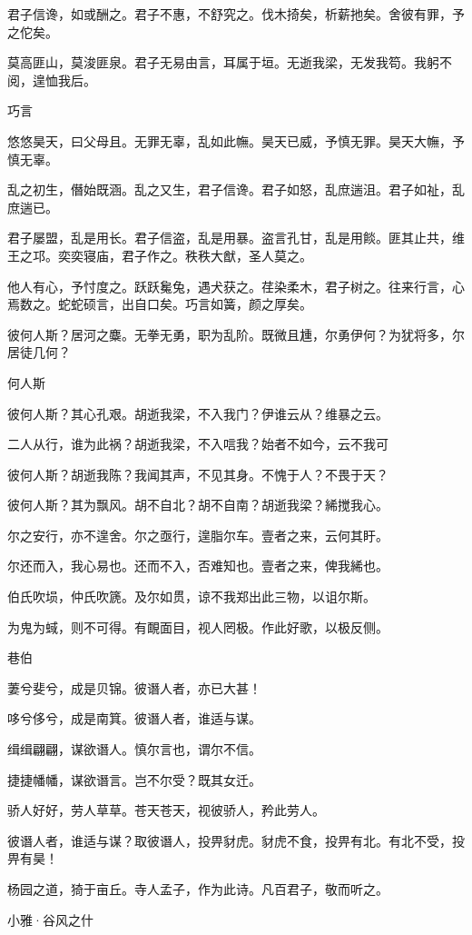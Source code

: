 君子信谗，如或酬之。君子不惠，不舒究之。伐木掎矣，析薪扡矣。舍彼有罪，予之佗矣。

莫高匪山，莫浚匪泉。君子无易由言，耳属于垣。无逝我梁，无发我笱。我躬不阅，遑恤我后。

巧言

悠悠昊天，曰父母且。无罪无辜，乱如此幠。昊天已威，予慎无罪。昊天大幠，予慎无辜。

乱之初生，僭始既涵。乱之又生，君子信谗。君子如怒，乱庶遄沮。君子如祉，乱庶遄已。

君子屡盟，乱是用长。君子信盗，乱是用暴。盗言孔甘，乱是用餤。匪其止共，维王之邛。奕奕寝庙，君子作之。秩秩大猷，圣人莫之。

他人有心，予忖度之。跃跃毚兔，遇犬获之。荏染柔木，君子树之。往来行言，心焉数之。蛇蛇硕言，出自口矣。巧言如簧，颜之厚矣。

彼何人斯？居河之麋。无拳无勇，职为乱阶。既微且尰，尔勇伊何？为犹将多，尔居徒几何？

何人斯

彼何人斯？其心孔艰。胡逝我梁，不入我门？伊谁云从？维暴之云。

二人从行，谁为此祸？胡逝我梁，不入唁我？始者不如今，云不我可

彼何人斯？胡逝我陈？我闻其声，不见其身。不愧于人？不畏于天？

彼何人斯？其为飘风。胡不自北？胡不自南？胡逝我梁？絺搅我心。

尔之安行，亦不遑舍。尔之亟行，遑脂尔车。壹者之来，云何其盱。

尔还而入，我心易也。还而不入，否难知也。壹者之来，俾我絺也。

伯氏吹埙，仲氏吹篪。及尔如贯，谅不我郑出此三物，以诅尔斯。

为鬼为蜮，则不可得。有靦面目，视人罔极。作此好歌，以极反侧。

巷伯

萋兮斐兮，成是贝锦。彼谮人者，亦已大甚！

哆兮侈兮，成是南箕。彼谮人者，谁适与谋。

缉缉翩翩，谋欲谮人。慎尔言也，谓尔不信。

捷捷幡幡，谋欲谮言。岂不尔受？既其女迁。

骄人好好，劳人草草。苍天苍天，视彼骄人，矜此劳人。

彼谮人者，谁适与谋？取彼谮人，投畀豺虎。豺虎不食，投畀有北。有北不受，投畀有昊！

杨园之道，猗于亩丘。寺人孟子，作为此诗。凡百君子，敬而听之。




小雅·谷风之什


